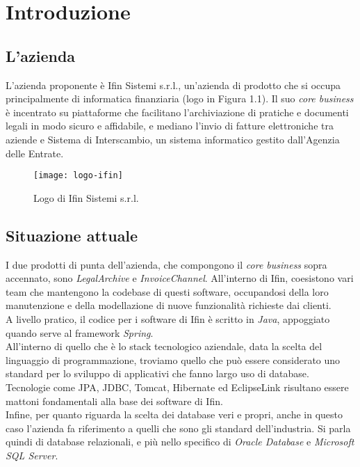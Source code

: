 
\chapter{Introduzione}
\label{cap:introduzione}

\section{L'azienda}

L'azienda proponente è Ifin Sistemi s.r.l., un'azienda di prodotto che si occupa principalmente di informatica finanziaria (logo in Figura 1.1).
Il suo \textit{core business} è incentrato su piattaforme che facilitano l'archiviazione di pratiche e documenti legali in modo sicuro e affidabile, e mediano l'invio di fatture elettroniche tra aziende e Sistema di Interscambio, un sistema informatico gestito dall'Agenzia delle Entrate.

\vspace{15pt}
\begin{figure}[htbp]
\begin{center}
\texttt{[image: logo-ifin]}
\caption{Logo di Ifin Sistemi s.r.l.}
\end{center}
\end{figure}
\vspace{15pt}

\section{Situazione attuale}

I due prodotti di punta dell'azienda, che compongono il \textit{core business} sopra accennato, sono \textit{LegalArchive} e \textit{InvoiceChannel}. All'interno di Ifin, coesistono vari team che mantengono la codebase di questi software, occupandosi della loro manutenzione e della modellazione di nuove funzionalità richieste dai clienti.\\
A livello pratico, il codice per i software di Ifin è scritto in \textit{Java}, appoggiato quando serve al framework \textit{Spring}.\\
All'interno di quello che è lo stack tecnologico aziendale, data la scelta del linguaggio di programmazione, troviamo quello che può essere considerato uno standard per lo sviluppo di applicativi che fanno largo uso di database. Tecnologie come \gls{JPA}, \gls{JDBC}, \gls{Tomcat}, \gls{Hibernate} ed \gls{EclipseLink} risultano essere mattoni fondamentali alla base dei software di Ifin.\\
Infine, per quanto riguarda la scelta dei database veri e propri, anche in questo caso l'azienda fa riferimento a quelli che sono gli standard dell'industria. Si parla quindi di database relazionali, e più nello specifico di \textit{Oracle Database} e \textit{Microsoft SQL Server}.\\

